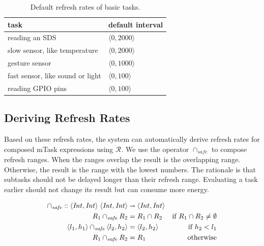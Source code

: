 \documentclass[runningheads]{llncs}
\newcommand{\CleanInline}[1]{\lstinline[language=Clean]!#1!}
\newcommand{\prog}[1]{\CleanInline{#1}}
\begin{document}
\begin{table}
	\centering
	\begin{tabular}{ll}
		\toprule
		task & default interval \\
		\midrule
		reading an SDS & $\langle 0, 2000 \rangle$ \\
		slow sensor, like temperature & $\langle 0, 2000 \rangle$ \\
		gesture sensor & $\langle 0, 1000 \rangle$ \\
		fast sensor, like sound or light & $\langle 0, 100 \rangle$ \\
		reading GPIO pins & $\langle 0, 100 \rangle$ \\
		\bottomrule
	\end{tabular}
	\caption{Default refresh rates of basic tasks.}%
	\label{tab:refresh}
\end{table}


\subsection{Deriving Refresh Rates}

Based on these refresh rates, the system can automatically derive refresh rates for composed mTask expressions using $\mathcal{R}$.
We use the operator $\cap_{\textit{safe}}$ to compose refresh ranges.
When the ranges overlap the result is the overlapping range.
Otherwise, the result is the range with the lowest numbers.
The rationale is that subtasks should not be delayed longer than their refresh range.
Evaluating a task earlier should not change its result but can consume more energy.


\begin{align}
	\cap_{\textit{safe}} :: \langle \mathit{Int}, \mathit{Int} \rangle \; \langle \mathit{Int}, \mathit{Int} \rangle & \shortrightarrow \langle \mathit{Int}, \mathit{Int} \rangle & \notag \\
	R_1 \cap_{\textit{safe}} R_2 & = R_1 \cap R_2 & \text{if } R_1 \cap R_2 \neq \emptyset \\
	\langle l_1, h_1 \rangle \cap_{\textit{safe}} \langle l_2, h_2 \rangle & = \langle l_2, h_2 \rangle & \text{if } h_2 < l_1 \\
	R_1 \cap_{\textit{safe}} R_2 & = R_1  & \text{otherwise}
\end{align}
\end{document}
